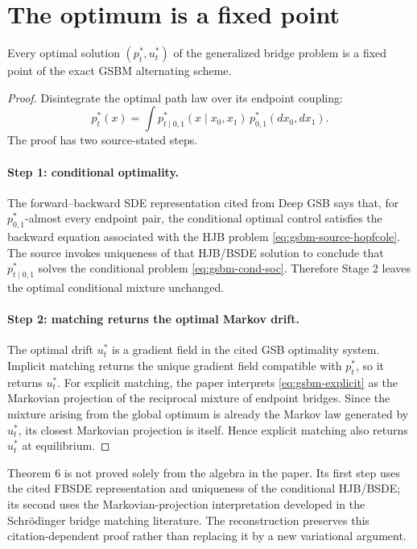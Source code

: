 \section{The optimum is a fixed point}
\begin{theorem}[Theorem 6]
Every optimal solution $(p_t^*,u_t^*)$ of the generalized bridge problem is a
fixed point of the exact GSBM alternating scheme.
\end{theorem}

\begin{proof}
Disintegrate the optimal path law over its endpoint coupling:
\[
  p_t^*(x)=\int p_{t\mid0,1}^*(x\mid x_0,x_1)
  \,p_{0,1}^*(dx_0,dx_1).
\]
The proof has two source-stated steps.

\paragraph{Step 1: conditional optimality.}
The forward--backward SDE representation cited from Deep GSB
\cite{LiuEtAl2022DeepGSB} says that, for $p_{0,1}^*$-almost every endpoint
pair, the conditional optimal control satisfies the backward equation
associated with the HJB problem \eqref{eq:gsbm-source-hopfcole}.  The source
invokes uniqueness of that HJB/BSDE solution to conclude that
$p_{t\mid0,1}^*$ solves the conditional problem \eqref{eq:gsbm-cond-soc}.
Therefore Stage 2 leaves the optimal conditional mixture unchanged.

\paragraph{Step 2: matching returns the optimal Markov drift.}
The optimal drift $u_t^*$ is a gradient field in the cited GSB optimality
system.  Implicit matching returns the unique gradient field compatible with
$p_t^*$, so it returns $u_t^*$.  For explicit matching, the paper interprets
\eqref{eq:gsbm-explicit} as the Markovian projection of the reciprocal mixture
of endpoint bridges.  Since the mixture arising from the global optimum is
already the Markov law generated by $u_t^*$, its closest Markovian projection
is itself.  Hence explicit matching also returns $u_t^*$ at equilibrium.
\end{proof}

\begin{remark}
Theorem 6 is not proved solely from the algebra in the paper.  Its first step
uses the cited FBSDE representation and uniqueness of the conditional HJB/BSDE;
its second uses the Markovian-projection interpretation developed in the
Schr\"odinger bridge matching literature.  The reconstruction preserves this
citation-dependent proof rather than replacing it by a new variational
argument.
\end{remark}

